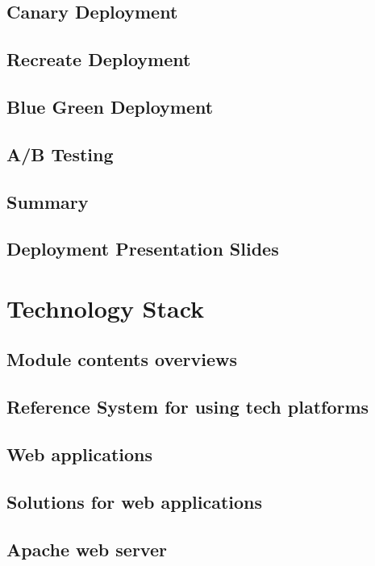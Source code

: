 \documentclass[11pt]{article}
\begin{document}
\section{Canary Deployment}

\section{Recreate Deployment}

\section{Blue Green Deployment}

\section{A/B Testing}

\section{Summary}

\section{Deployment Presentation Slides}

\chapter{Technology Stack}
    
\section{Module contents overviews}
    
\section{Reference System for using tech platforms}
    
\section{Web applications}

\section{Solutions for web applications}
    
\section{Apache web server}
    
\end{document}
